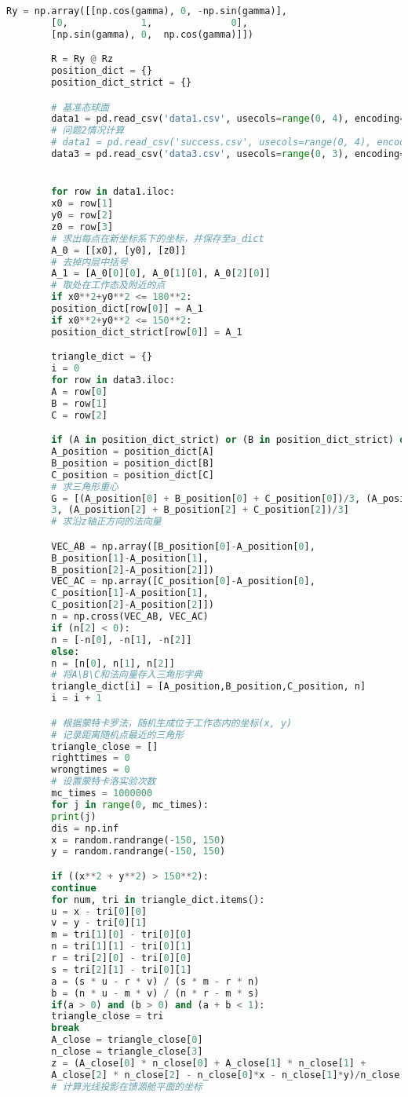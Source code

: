 \documentclass{cumcmthesis}
\begin{document}
\begin{appendices}
\begin{lstlisting}[language={python}]
		Ry = np.array([[np.cos(gamma), 0, -np.sin(gamma)],
		[0,             1,              0],
		[np.sin(gamma), 0,  np.cos(gamma)]])

		R = Ry @ Rz
		position_dict = {}
		position_dict_strict = {}

		# 基准态球面
		data1 = pd.read_csv('data1.csv', usecols=range(0, 4), encoding="gbk")
		# 问题2情况计算
		# data1 = pd.read_csv('success.csv', usecols=range(0, 4), encoding="gbk")
		data3 = pd.read_csv('data3.csv', usecols=range(0, 3), encoding="gbk")


		for row in data1.iloc:
		x0 = row[1]
		y0 = row[2]
		z0 = row[3]
		# 求出每点在新坐标系下的坐标，并保存至a_dict
		A_0 = [[x0], [y0], [z0]]
		# 去掉内层中括号
		A_1 = [A_0[0][0], A_0[1][0], A_0[2][0]]
		# 取处在工作态及附近的点
		if x0**2+y0**2 <= 180**2:
		position_dict[row[0]] = A_1
		if x0**2+y0**2 <= 150**2:
		position_dict_strict[row[0]] = A_1

		triangle_dict = {}
		i = 0
		for row in data3.iloc:
		A = row[0]
		B = row[1]
		C = row[2]

		if (A in position_dict_strict) or (B in position_dict_strict) or (C in position_dict_strict):
		A_position = position_dict[A]
		B_position = position_dict[B]
		C_position = position_dict[C]
		# 求三角形重心
		G = [(A_position[0] + B_position[0] + C_position[0])/3, (A_position[1] + B_position[1] + C_position[1]) /
		3, (A_position[2] + B_position[2] + C_position[2])/3]
		# 求沿z轴正方向的法向量

		VEC_AB = np.array([B_position[0]-A_position[0],
		B_position[1]-A_position[1],
		B_position[2]-A_position[2]])
		VEC_AC = np.array([C_position[0]-A_position[0],
		C_position[1]-A_position[1],
		C_position[2]-A_position[2]])
		n = np.cross(VEC_AB, VEC_AC)
		if (n[2] < 0):
		n = [-n[0], -n[1], -n[2]]
		else:
		n = [n[0], n[1], n[2]]
		# 将A\B\C和法向量存入三角形字典
		triangle_dict[i] = [A_position,B_position,C_position, n]
		i = i + 1

		# 根据蒙特卡罗法，随机生成位于工作态内的坐标(x, y)
		# 记录距离随机点最近的三角形
		triangle_close = []
		righttimes = 0
		wrongtimes = 0
		# 设置蒙特卡洛实验次数
		mc_times = 1000000
		for j in range(0, mc_times):
		print(j)
		dis = np.inf
		x = random.randrange(-150, 150)
		y = random.randrange(-150, 150)

		if ((x**2 + y**2) > 150**2):
		continue
		for num, tri in triangle_dict.items():
		u = x - tri[0][0]
		v = y - tri[0][1]
		m = tri[1][0] - tri[0][0]
		n = tri[1][1] - tri[0][1]
		r = tri[2][0] - tri[0][0]
		s = tri[2][1] - tri[0][1]
		a = (s * u - r * v) / (s * m - r * n)
		b = (n * u - m * v) / (n * r - m * s)
		if(a > 0) and (b > 0) and (a + b < 1):
		triangle_close = tri
		break
		A_close = triangle_close[0]
		n_close = triangle_close[3]
		z = (A_close[0] * n_close[0] + A_close[1] * n_close[1] +
		A_close[2] * n_close[2] - n_close[0]*x - n_close[1]*y)/n_close[2]
		# 计算光线投影在馈源舱平面的坐标


\end{lstlisting}
\end{appendices}
\end{document}
